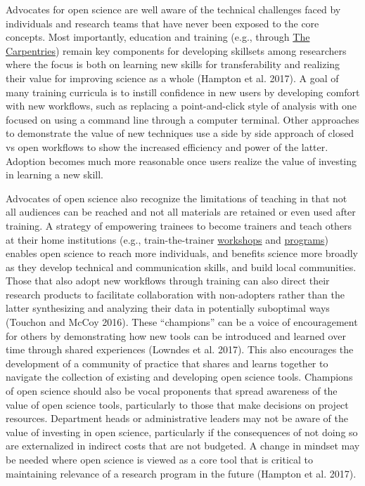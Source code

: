 \documentclass[fleqn,10pt,lineno]{wlpeerj} %
\begin{document}
Advocates for open science are well aware of the technical challenges faced by individuals and research teams that have never been exposed to the core concepts. Most importantly, education and training (e.g., through \href{https://carpentries.org}{The Carpentries}) remain key components for developing skillsets among researchers where the focus is both on learning new skills for transferability and realizing their value for improving science as a whole (Hampton et al. 2017). A goal of many training curricula is to instill confidence in new users by developing comfort with new workflows, such as replacing a point-and-click style of analysis with one focused on using a command line through a computer terminal. Other approaches to demonstrate the value of new techniques use a side by side approach of closed vs open workflows to show the increased efficiency and power of the latter. Adoption becomes much more reasonable once users realize the value of investing in learning a new skill.

Advocates of open science also recognize the limitations of teaching in that not all audiences can be reached and not all materials are retained or even used after training. A strategy of empowering trainees to become trainers and teach others at their home institutions (e.g., train-the-trainer \href{https://blog.rstudio.com/2019/02/06/rstudio-conf-2019-workshops/}{workshops} and \href{https://carpentries.github.io/trainer-training/}{programs}) enables open science to reach more individuals, and benefits science more broadly as they develop technical and communication skills, and build local communities. Those that also adopt new workflows through training can also direct their research products to facilitate collaboration with non-adopters rather than the latter synthesizing and analyzing their data in potentially suboptimal ways (Touchon and McCoy 2016). These ``champions'' can be a voice of encouragement for others by demonstrating how new tools can be introduced and learned over time through shared experiences (Lowndes et al. 2017). This also encourages the development of a community of practice that shares and learns together to navigate the collection of existing and developing open science tools. Champions of open science should also be vocal proponents that spread awareness of the value of open science tools, particularly to those that make decisions on project resources. Department heads or administrative leaders may not be aware of the value of investing in open science, particularly if the consequences of not doing so are externalized in indirect costs that are not budgeted. A change in mindset may be needed where open science is viewed as a core tool that is critical to maintaining relevance of a research program in the future (Hampton et al. 2017).
\end{document}

